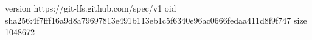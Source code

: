 version https://git-lfs.github.com/spec/v1
oid sha256:4f7fff16a9d8a79697813e491b113eb1c5f6340e96ac0666fedaa411d8f9f747
size 1048672
